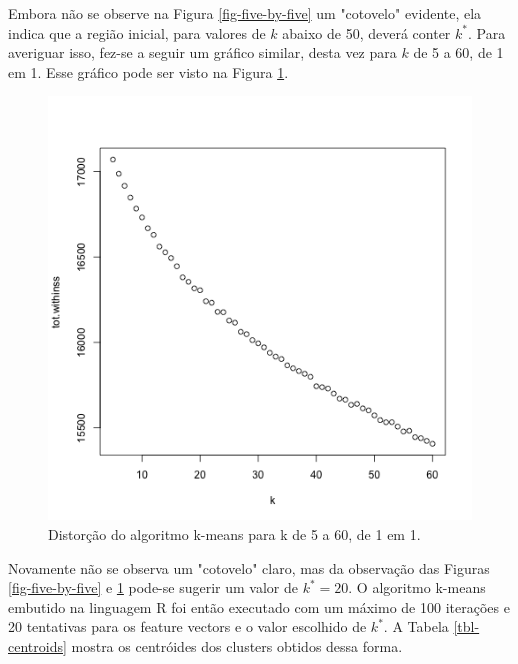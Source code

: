 \documentclass[10pt,twocolumn,letterpaper]{article}
\begin{document}
Embora não se observe na Figura \ref{fig-five-by-five} um "cotovelo" evidente, ela indica que a região inicial, para valores de $k$ abaixo de 50, deverá conter $k^{*}$. Para averiguar isso, fez-se a seguir um gráfico similar, desta vez para $k$ de 5 a 60, de 1 em 1. Esse gráfico pode ser visto na Figura \ref{fig-one-by-one}.

\begin{figure}
\begin{center}
	\includegraphics[width=0.99\columnwidth]{pics/one-by-one}
	\caption{Distorção do algoritmo k-means para k de 5 a 60, de 1 em 1.}
	\label{fig-one-by-one}   
\end{center} 
\end{figure} 

Novamente não se observa um "cotovelo" claro, mas da observação das Figuras \ref{fig-five-by-five} e \ref{fig-one-by-one} pode-se sugerir um valor de $k^{*} = 20$. O algoritmo k-means embutido na linguagem R foi então executado com um máximo de 100 iterações e 20 tentativas para os feature vectors e o valor escolhido de $k^{*}$. A Tabela \ref{tbl-centroids} mostra os centróides dos clusters obtidos dessa forma.
\end{document}
